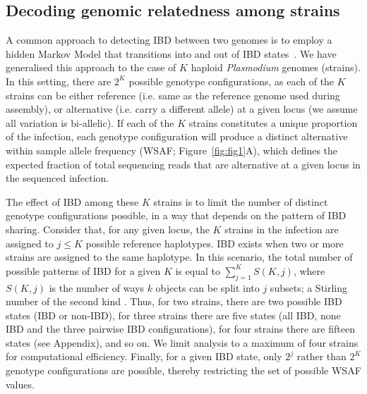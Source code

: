 \documentclass[9pt,lineno]{elife}
\begin{document}
\subsection{Decoding genomic relatedness among strains}

A common approach to detecting IBD between two genomes is to employ a hidden Markov Model that transitions into and out of IBD states~\citep{Chang2015, Gusev2009, Gusev2011}.  We have generalised this approach to the case of $K$ haploid {\it Plasmodium} genomes (strains). In this setting, there are $2^K$ possible genotype configurations, as each of the $K$ strains can be either reference (i.e. same as the reference genome used during assembly), or alternative (i.e. carry a different allele) at a given locus (we assume all variation is bi-allelic). If each of the $K$ strains constitutes a unique proportion of the infection, each genotype configuration will produce a distinct alternative within sample allele frequency (WSAF; Figure~\ref{fig:fig1}A), which defines the expected fraction of total sequencing reads that are alternative at a given locus in the sequenced infection.

The effect of IBD among these $K$ strains is to limit the number of distinct genotype configurations possible, in a way that depends on the pattern of IBD sharing. Consider that, for any given locus, the $K$ strains in the infection are assigned to $j \leq K$ possible reference haplotypes. IBD exists when two or more strains are assigned to the same haplotype. In this scenario, the total number of possible patterns of IBD for a given $K$ is equal to $\sum_{j=1}^{K} S(K,j)$, where $S(K,j)$ is the number of ways $k$ objects can be split into $j$ subsets; a Stirling number of the second kind \citep{Ronald1988}. Thus, for two strains, there are two possible IBD states (IBD or non-IBD), for three strains there are five states (all IBD, none IBD and the three pairwise IBD configurations), for four strains there are fifteen states (see Appendix), and so on. We limit analysis to a maximum of four strains for computational efficiency. Finally, for a given IBD state, only $2^j$ rather than $2^K$ genotype configurations are possible, thereby restricting the set of possible WSAF values.
\end{document}
